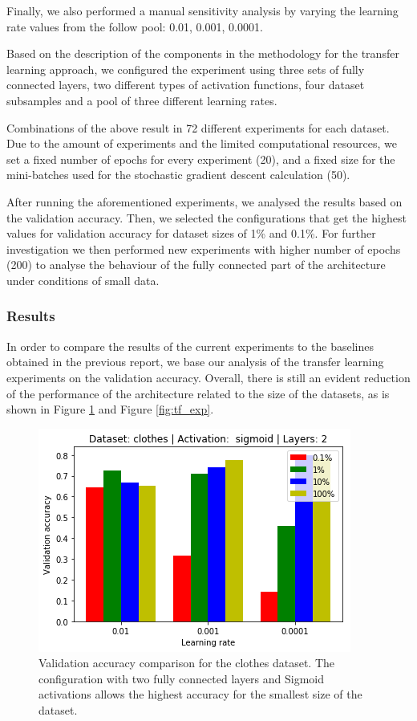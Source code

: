 \documentclass{article}
\begin{document}
Finally, we also performed a manual sensitivity analysis by varying the learning rate values from the follow pool: 0.01, 0.001, 0.0001.

Based on the description of the components in the methodology for the transfer learning approach, we configured the experiment using three sets of fully connected layers, two different types of activation functions, four dataset subsamples and a pool of three different learning rates.

Combinations of the above result in 72 different experiments for each dataset. Due to the amount of experiments and the limited computational resources, we set a fixed number of epochs for every experiment (20), and a fixed size for the mini-batches used for the stochastic gradient descent calculation (50).

After running the aforementioned experiments, we analysed the results based on the validation accuracy. Then, we selected the configurations that get the highest values for validation accuracy for dataset sizes of 1\% and 0.1\%. For further investigation we then performed new experiments with higher number of epochs (200) to analyse the behaviour of the fully connected part of the architecture under conditions of small data.

\subsubsection{\textbf{Results}}

In order to compare the results of the current experiments to the baselines obtained in the previous report, we base our analysis of the transfer learning experiments on the validation accuracy. Overall, there is still an evident reduction of the performance of the architecture related to the size of the datasets, as is shown in Figure \ref{fig:tf_clot} and Figure \ref{fig:tf_exp}.

\begin{figure}[tb]
    \vskip 5mm
        \begin{center}
            \includegraphics[scale=0.5]{accuracy_reduction_00.png}
            \caption{Validation accuracy comparison for the clothes dataset. The configuration with two fully connected layers and Sigmoid activations allows the highest accuracy for the smallest size of the dataset.}
            \label{fig:tf_clot}
        \end{center}
    \vskip -5mm
\end{figure}
\end{document}
